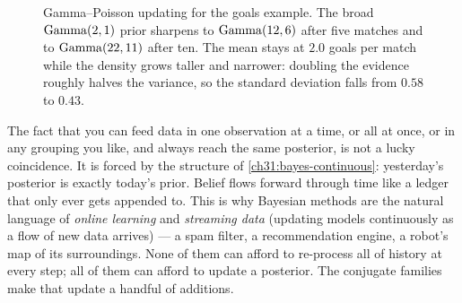 \begin{figure}[H]
\centering
{}
\caption{Gamma--Poisson updating for the goals example. The broad $\operatorname{Gamma}(2,1)$ prior
sharpens to $\operatorname{Gamma}(12,6)$ after five matches and to $\operatorname{Gamma}(22,11)$ after ten. The mean stays
at $2.0$ goals per match while the density grows taller and narrower: doubling the evidence
roughly halves the variance, so the standard deviation falls from $0.58$ to $0.43$.}
\label{ch31:fig-gammapoisson}
\end{figure}

\begin{aestheticbox}
The fact that you can feed data in one observation at a time, or all at once, or in any
grouping you like, and always reach the same posterior, is not a lucky coincidence. It is
forced by the structure of \eqref{ch31:bayes-continuous}: yesterday's posterior is exactly
today's prior. Belief flows forward through time like a ledger that only ever gets
appended to. This is why Bayesian methods are the natural language of \emph{online
learning} and \emph{streaming data} (updating models continuously as a flow of new data arrives) --- a spam filter, a recommendation engine, a robot's
map of its surroundings. None of them can afford to re-process all of history at every
step; all of them can afford to update a posterior. The conjugate families make that update
a handful of additions.
\end{aestheticbox}

